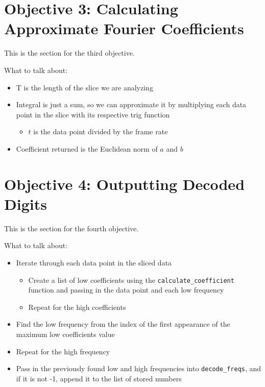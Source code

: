 \documentclass[12pt]{iopart}
\begin{document}
\pagebreak


\section{Objective 3: Calculating Approximate Fourier Coefficients}

This is the section for the third objective. \newline

What to talk about:
\begin{itemize}
    \item T is the length of the slice we are analyzing
    \item Integral is just a sum, so we can approximate it by multiplying each data point in the slice with its respective trig function
    \begin{itemize}
        \item $t$ is the data point divided by the frame rate
    \end{itemize}
    \item Coefficient returned is the Euclidean norm of $a$ and $b$
\end{itemize}

\pagebreak

\section{Objective 4: Outputting Decoded Digits}

This is the section for the fourth objective. \newline

What to talk about:
\begin{itemize}
    \item Iterate through each data point in the sliced data
    \begin{itemize}
        \item Create a list of low coefficients using the \verb|calculate_coefficient| function and passing in the data point and each low frequency
        \item Repeat for the high coefficients
    \end{itemize}
    \item Find the low frequency from the index of the first appearance of the maximum low coefficients value
    \item Repeat for the high frequency
    \item Pass in the previously found low and high frequencies into \verb|decode_freqs|, and if it is not -1, append it to the list of stored numbers
\end{itemize}
\end{document}
